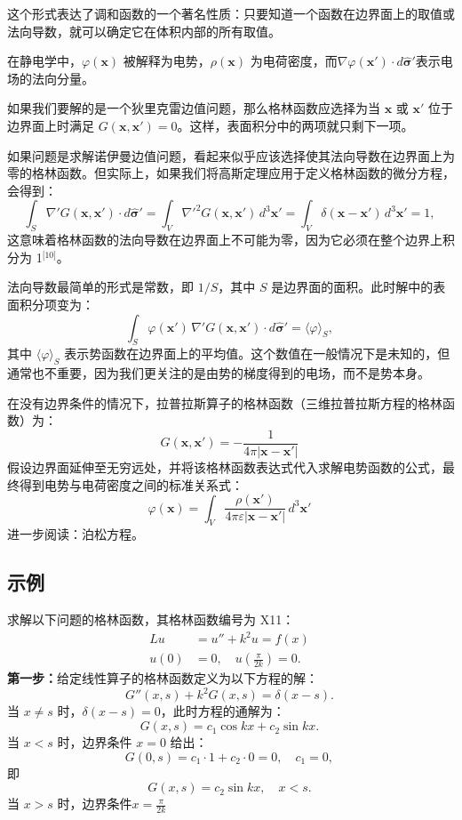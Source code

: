 这个形式表达了调和函数的一个著名性质：只要知道一个函数在边界面上的取值或法向导数，就可以确定它在体积内部的所有取值。

在静电学中，$\varphi(\mathbf{x})$ 被解释为电势，$\rho(\mathbf{x})$ 为电荷密度，而$\nabla \varphi(\mathbf{x}') \cdot d\hat{\boldsymbol{\sigma}}'$表示电场的法向分量。

如果我们要解的是一个狄里克雷边值问题，那么格林函数应选择为当 $\mathbf{x}$ 或 $\mathbf{x}'$ 位于边界面上时满足 $G(\mathbf{x}, \mathbf{x}') = 0$。这样，表面积分中的两项就只剩下一项。

如果问题是求解诺伊曼边值问题，看起来似乎应该选择使其法向导数在边界面上为零的格林函数。但实际上，如果我们将高斯定理应用于定义格林函数的微分方程，会得到：
$$
\int_S \nabla' G(\mathbf{x}, \mathbf{x}') \cdot d\hat{\boldsymbol{\sigma}}' = \int_V \nabla'^2 G(\mathbf{x}, \mathbf{x}')\,d^3\mathbf{x}' = \int_V \delta(\mathbf{x} - \mathbf{x}')\,d^3\mathbf{x}' = 1,~
$$
这意味着格林函数的法向导数在边界面上不可能为零，因为它必须在整个边界上积分为 1\(^\text{[10]}\)。

法向导数最简单的形式是常数，即 $1/S$，其中 $S$ 是边界面的面积。此时解中的表面积分项变为：
$$
\int_S \varphi(\mathbf{x}')\,\nabla' G(\mathbf{x}, \mathbf{x}') \cdot d\hat{\boldsymbol{\sigma}}' = \langle \varphi \rangle_S,~
$$
其中 $\langle \varphi \rangle_S$ 表示势函数在边界面上的平均值。这个数值在一般情况下是未知的，但通常也不重要，因为我们更关注的是由势的梯度得到的电场，而不是势本身。

在没有边界条件的情况下，拉普拉斯算子的格林函数（三维拉普拉斯方程的格林函数）为：
$$
G(\mathbf{x}, \mathbf{x}') = -\frac{1}{4\pi |\mathbf{x} - \mathbf{x}'|}~
$$
假设边界面延伸至无穷远处，并将该格林函数表达式代入求解电势函数的公式，最终得到电势与电荷密度之间的标准关系式：
$$
\varphi(\mathbf{x}) = \int_V \frac{\rho(\mathbf{x}')}{4\pi \varepsilon |\mathbf{x} - \mathbf{x}'|} \, d^3\mathbf{x}'~
$$
进一步阅读：泊松方程。
\subsection{示例}
求解以下问题的格林函数，其格林函数编号为 X11：
$$
\begin{aligned}
Lu &= u'' + k^2 u = f(x) \\
u(0) &= 0, \quad u\left(\frac{\pi}{2k}\right) = 0.
\end{aligned}~
$$
\textbf{第一步：}给定线性算子的格林函数定义为以下方程的解：
$$
G''(x,s) + k^2 G(x,s) = \delta(x-s). \tag{Eq.*}~
$$
当 $x \neq s$ 时，$\delta(x-s) = 0$，此时方程的通解为：
$$
G(x,s) = c_1 \cos kx + c_2 \sin kx.~
$$
当 $x < s$ 时，边界条件 $x = 0$ 给出：
$$
G(0,s) = c_1 \cdot 1 + c_2 \cdot 0 = 0,
\quad c_1 = 0,~
$$
即
$$
G(x,s) = c_2 \sin kx, \quad x < s.~
$$
当 $x > s$ 时，边界条件$x = \frac{\pi}{2k}$

